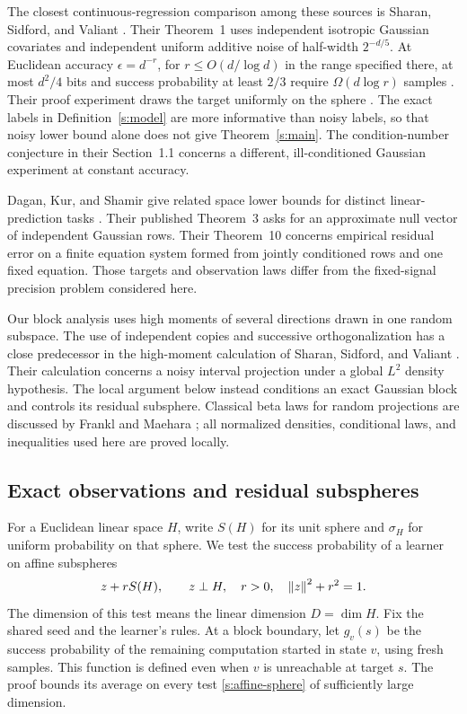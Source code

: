 The closest continuous-regression comparison among these sources is
Sharan, Sidford, and Valiant \cite{SSV2019}. Their Theorem~1 uses
independent isotropic Gaussian covariates and independent uniform
additive noise of half-width \(2^{-d/5}\). At Euclidean accuracy
\(\epsilon=d^{-r}\), for \(r\le O(d/\log d)\) in the range specified
there, at most \(d^2/4\) bits and success probability at least \(2/3\)
require \(\Omega(d\log r)\) samples
\cite[Theorem~1]{SSV2019}. Their proof experiment draws the target
uniformly on the sphere \cite[Section~2]{SSV2019}. The exact labels in
Definition~\ref{s:model} are more informative than noisy labels, so
that noisy lower bound alone does not give Theorem~\ref{s:main}.
The condition-number conjecture in their Section~1.1 concerns a
different, ill-conditioned Gaussian experiment at constant accuracy.

Dagan, Kur, and Shamir give related space lower bounds for distinct
linear-prediction tasks \cite{DKS2019}. Their published Theorem~3 asks
for an approximate null vector of independent Gaussian rows. Their
Theorem~10 concerns empirical residual error on a finite equation
system formed from jointly conditioned rows and one fixed equation.
Those targets and observation laws differ from the fixed-signal
precision problem considered here.

Our block analysis uses high moments of several directions drawn in
one random subspace. The use of independent copies and successive
orthogonalization has a close predecessor in the high-moment
calculation of Sharan, Sidford, and Valiant
\cite[Section~7, Lemma~12]{SSV2019}. Their calculation concerns a noisy
interval projection under a global \(L^2\) density hypothesis. The
local argument below instead conditions an exact Gaussian block and
controls its residual subsphere. Classical beta laws for random
projections are discussed by Frankl and Maehara
\cite{FranklMaehara1990}; all normalized densities, conditional laws,
and inequalities used here are proved locally.

\subsection*{Exact observations and residual subspheres}

For a Euclidean linear space \(H\), write \(S(H)\) for its unit sphere
and \(\sigma_H\) for uniform probability on that sphere. We test the
success probability of a learner on affine subspheres
\begin{equation}\label{s:affine-sphere}
 z+rS(H),\qquad z\perp H,\quad r>0,\quad \left\lVert z\right\rVert^2+r^2=1.
\end{equation}
The dimension of this test means the linear dimension \(D=\dim H\).
Fix the shared seed and the learner's rules. At a block boundary, let
\(g_v(s)\) be the success probability of the
remaining computation started in state \(v\), using fresh samples.
This function is defined even when \(v\) is unreachable at target
\(s\). The proof bounds its average on every test
\eqref{s:affine-sphere} of sufficiently large dimension.

